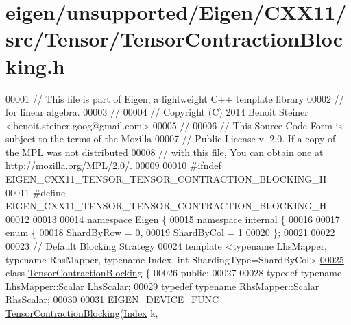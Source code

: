 \hypertarget{eigen_2unsupported_2_eigen_2_c_x_x11_2src_2_tensor_2_tensor_contraction_blocking_8h_source}{}\section{eigen/unsupported/\+Eigen/\+C\+X\+X11/src/\+Tensor/\+Tensor\+Contraction\+Blocking.h}
\label{eigen_2unsupported_2_eigen_2_c_x_x11_2src_2_tensor_2_tensor_contraction_blocking_8h_source}

\begin{DoxyCode}
00001 \textcolor{comment}{// This file is part of Eigen, a lightweight C++ template library}
00002 \textcolor{comment}{// for linear algebra.}
00003 \textcolor{comment}{//}
00004 \textcolor{comment}{// Copyright (C) 2014 Benoit Steiner <benoit.steiner.goog@gmail.com>}
00005 \textcolor{comment}{//}
00006 \textcolor{comment}{// This Source Code Form is subject to the terms of the Mozilla}
00007 \textcolor{comment}{// Public License v. 2.0. If a copy of the MPL was not distributed}
00008 \textcolor{comment}{// with this file, You can obtain one at http://mozilla.org/MPL/2.0/.}
00009 
00010 \textcolor{preprocessor}{#ifndef EIGEN\_CXX11\_TENSOR\_TENSOR\_CONTRACTION\_BLOCKING\_H}
00011 \textcolor{preprocessor}{#define EIGEN\_CXX11\_TENSOR\_TENSOR\_CONTRACTION\_BLOCKING\_H}
00012 
00013 
00014 \textcolor{keyword}{namespace }\hyperlink{namespace_eigen}{Eigen} \{
00015 \textcolor{keyword}{namespace }\hyperlink{namespaceinternal}{internal} \{
00016 
00017 \textcolor{keyword}{enum} \{
00018   ShardByRow = 0,
00019   ShardByCol = 1
00020 \};
00021 
00022 
00023 \textcolor{comment}{// Default Blocking Strategy}
00024 \textcolor{keyword}{template} <\textcolor{keyword}{typename} LhsMapper, \textcolor{keyword}{typename} RhsMapper, \textcolor{keyword}{typename} Index, \textcolor{keywordtype}{int} ShardingType=ShardByCol>
\hyperlink{class_eigen_1_1internal_1_1_tensor_contraction_blocking}{00025} \textcolor{keyword}{class }\hyperlink{class_eigen_1_1internal_1_1_tensor_contraction_blocking}{TensorContractionBlocking} \{
00026  \textcolor{keyword}{public}:
00027 
00028   \textcolor{keyword}{typedef} \textcolor{keyword}{typename} LhsMapper::Scalar LhsScalar;
00029   \textcolor{keyword}{typedef} \textcolor{keyword}{typename} RhsMapper::Scalar RhsScalar;
00030 
00031   EIGEN\_DEVICE\_FUNC \hyperlink{class_eigen_1_1internal_1_1_tensor_contraction_blocking}{TensorContractionBlocking}(\hyperlink{namespace_eigen_a62e77e0933482dafde8fe197d9a2cfde}{Index} k, 

\end{DoxyCode}
